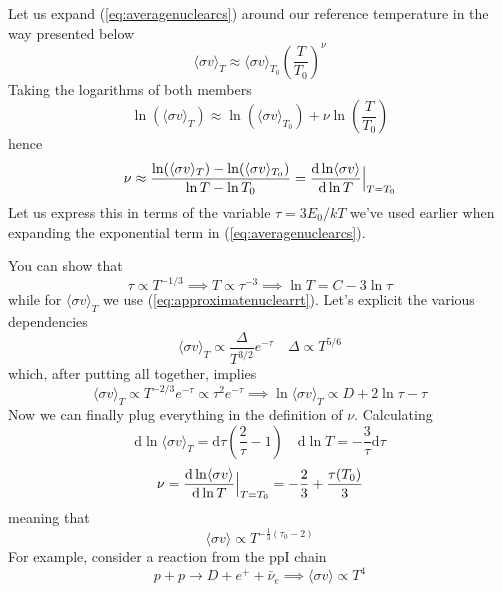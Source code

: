Let us expand (\ref{eq:averagenuclearcs}) around our reference temperature in the way presented below 
\begin{equation*}
    \langle \sigma v \rangle_{T} \approx  \langle \sigma v \rangle_{T_{0}}\left(\frac{T}{T_{0}}\right)^{\nu}
\end{equation*} 
Taking the logarithms of both members
\begin{equation*}
    \ln( \langle \sigma v \rangle_{T}) \approx \ln( \langle \sigma v \rangle_{T_{0}})+\nu\ln\left(\frac{T}{T_{0}}\right)
\end{equation*}
hence 
\begin{equation*}
    \nu \approx \frac{ \ln( \langle \sigma v \rangle_{T}) - \ln( \langle \sigma v \rangle_{T_{0}})}{\ln T -\ln T_{0}} = \frac{\text{d}\ln\langle \sigma v \rangle}{\text{d}\ln T}\Big|_{T=T_{0}}
\end{equation*}
Let us express this in terms of the variable $\tau = 3E_{0}/kT$ we've used earlier when expanding the exponential term in (\ref{eq:averagenuclearcs}).
\par You can show that 
\begin{equation*}
    \tau \propto T^{-1/3}\implies T\propto \tau^{-3} \implies \ln T = C-3\ln\tau
\end{equation*}
while for $\langle \sigma v \rangle_{T}$ we use (\ref{eq:approximatenuclearrt}). Let's explicit the various dependencies
\begin{equation*}
    \langle \sigma v \rangle_{T} \propto \frac{\Delta}{T^{3/2}}e^{-\tau} \quad \Delta \propto T^{5/6}
\end{equation*}
which, after putting all together, implies 
\begin{equation*}
    \langle \sigma v \rangle_{T} \propto T^{-2/3}e^{-\tau} \propto \tau^{2}e^{-\tau} \implies \ln\langle \sigma v \rangle_{T} \propto D +2\ln\tau -\tau
\end{equation*}
Now we can finally plug everything in the definition of $\nu$. Calculating
\begin{equation*}
    \text{d}\ln\langle \sigma v \rangle_{T} = \text{d}\tau\left(\frac{2}{\tau}-1\right) \quad \text{d}\ln T = -\frac{3}{\tau}\text{d}\tau
\end{equation*}
\begin{equation*}
    \nu = \frac{\text{d}\ln\langle \sigma v \rangle}{\text{d}\ln T}\Big|_{T=T_{0}} = -\frac{2}{3}+\frac{\tau(T_{0})}{3}
\end{equation*}
meaning that 
\begin{equation}
    \boxed{
    \langle \sigma v \rangle \propto T^{-\frac{1}{3}(\tau_{0}-2)}
    }
    \label{eq:nrtemperaturedep}
\end{equation}
For example, consider a reaction from the $\text{ppI}$ chain
\begin{equation*}
    p+p \to D + e^{+}+\bar{\nu}_{e} \implies \langle \sigma v \rangle\propto T^{4}
\end{equation*}

